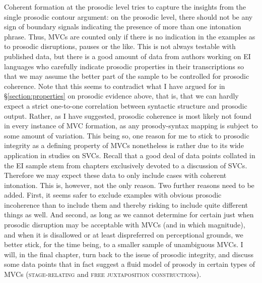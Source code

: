 Coherent formation at the prosodic level tries to capture the insights from the single prosodic contour argument: on the prosodic level, there should not be any sign of boundary signals indicating the presence of more than one intonation phrase. Thus, MVCs are counted only if there is no indication in the examples as to prosodic disruptions, pauses or the like. This is not always testable with published data, but there is a good amount of data from authors working on EI languages who carefully indicate prosodic properties in their transcriptions so that we may assume the better part of the sample to be controlled for prosodic coherence. Note that this seems to contradict what I have argued for in §\ref{section:properties} on prosodic evidence above, that is, that we can hardly expect a strict one-to-one correlation between syntactic structure and prosodic output. Rather, as I have suggested, prosodic coherence is most likely not found in every instance of MVC formation, as any prosody-syntax mapping is subject to some amount of variation. This being so, one reason for me to stick to prosodic integrity as a defining property of MVCs nonetheless is rather due to its wide application in studies on SVCs. Recall that a good deal of data points collated in the EI sample stem from chapters exclusively devoted to a discussion of SVCs. Therefore we may expect these data to only include cases with coherent intonation. This is, however, not the only reason. Two further reasons need to be added. First, it seems safer to exclude examples with obvious prosodic incoherence than to include them and thereby risking to include quite different things as well. And second, as long as we cannot determine for certain just when prosodic disruption may be acceptable with MVCs (and in which magnitude), and when it is disallowed or at least dispreferred on perceptional grounds, we better stick, for the time being, to a smaller sample of unambiguous MVCs. I will, in the final chapter, turn back to the issue of prosodic integrity, and discuss some data points that in fact suggest a fluid model of prosody in certain types of MVCs (\textsc{stage-relating} and \textsc{free juxtaposition construction}s).

